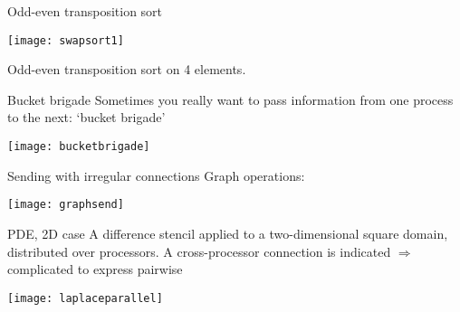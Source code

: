 \begin{exerciseframe}[sendrecv]
  
\end{exerciseframe}

\begin{numberedframe}{Odd-even transposition sort}
  \label{fig:swapsort1}

  \texttt{[image: swapsort1]}

  Odd-even transposition sort on 4 elements.
\end{numberedframe}

\begin{optexerciseframe}
  \footnotesize
  
\end{optexerciseframe}

\begin{numberedframe}{Bucket brigade}
  Sometimes you really want to pass information from one process to
  the next: `bucket brigade'

  \texttt{[image: bucketbrigade]}
\end{numberedframe}

\begin{exerciseframe}[bucketblock]
  
\end{exerciseframe}


\begin{numberedframe}{Sending with irregular connections}
  Graph operations:
  
  \texttt{[image: graphsend]}
\end{numberedframe}

  
\begin{numberedframe}{PDE, 2D case}
    A difference stencil applied to a two-dimensional square
    domain, distributed over processors. A cross-processor connection
    is indicated $\Rightarrow$ complicated to express pairwise

    \texttt{[image: laplaceparallel]}
\end{numberedframe}


